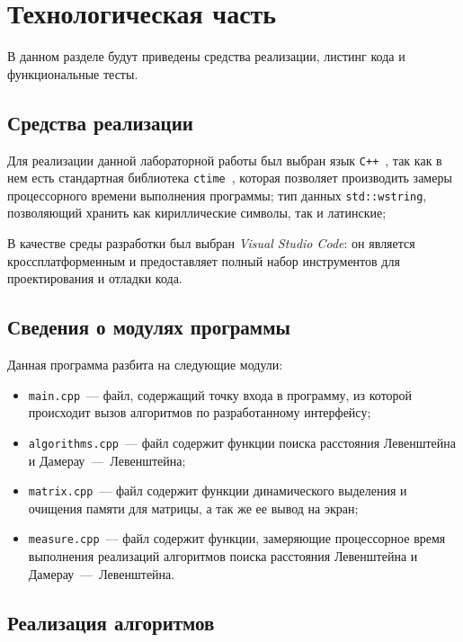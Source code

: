 \chapter{Технологическая часть}

В данном разделе будут приведены средства реализации, листинг кода и функциональные тесты.

\section{Средства реализации}

Для реализации данной лабораторной работы был выбран язык \texttt{C++}~\cite{cpp-lang}, так как в нем есть стандартная библиотека \texttt{ctime}~\cite{cpp-lang-time}, которая позволяет производить замеры процессорного времени выполнения программы; тип данных \texttt{std::wstring}, позволяющий хранить как кириллические символы, так и латинские;

В качестве среды разработки был выбран \textit{Visual Studio Code}: он является кроссплатформенным и предоставляет полный набор инструментов для проектирования и отладки кода.
 
\section{Сведения о модулях программы}

Данная программа разбита на следующие модули:

\begin{itemize}
	\item \texttt{main.cpp}~--- файл, содержащий точку входа в программу, из которой происходит вызов алгоритмов по разработанному интерфейсу;
	\item \texttt{algorithms.cpp}~--- файл содержит функции поиска расстояния Левенштейна и Дамерау~---~Левенштейна;
	\item \texttt{matrix.cpp}~--- файл содержит функции динамического выделения и очищения памяти для матрицы, а так же ее вывод на экран;
	\item \texttt{measure.cpp}~--- файл содержит функции, замеряющие процессорное время выполнения реализаций алгоритмов поиска расстояния Левенштейна и Дамерау~---~Левенштейна.
\end{itemize}

\section{Реализация алгоритмов}

